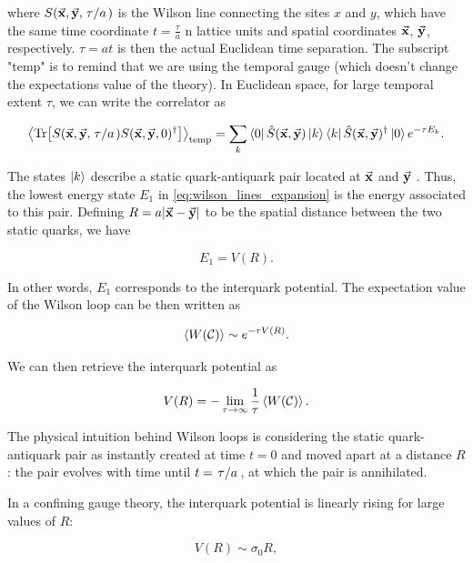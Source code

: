 \documentclass[reqno,12pt]{article}
\numberwithin{equation}{section}
\begin{document}
where $S(\va{x}, \va{y}, \flatfrac{\tau}{a})$ is the Wilson line connecting the sites $x$ and $y$, which have the same time
coordinate $t = \frac{\tau}{a}$ n lattice units and spatial coordinates $\va{x}$, $\va{y}$, respectively. $\tau = at$ is then
the actual Euclidean time separation. The subscript "temp" is to
remind that we are using the temporal gauge (which doesn't change the expectations value of the theory). 
In Euclidean space, for large temporal extent $\tau$, we can write the correlator as

\begin{equation} \label{eq:wilson_lines_expansion}
	\expval{\Tr[S(\va{x}, \va{y}, \flatfrac{\tau}{a})S(\va{x}, \va{y}, 0)^\dagger]}_\text{temp} = 
	\sum_k \bra{0}\hat{S}(\va{x}, \va{y})\ket{k}\bra{k}\hat{S}(\va{x}, \va{y})^\dagger\ket{0} e^{-\tau E_k}.
\end{equation}

The states $\ket{k}$ describe a static quark-antiquark pair located at $\va{x}$ and $\va{y}$ \cite{gattringer}. 
Thus, the lowest energy state $E_1$ in \eqref{eq:wilson_lines_expansion} is the energy associated to this pair. 
Defining $R = a|\va{x} - \va{y}|$ to be the spatial distance between the two static quarks, we have

\begin{equation}
	E_1 = V(R).
\end{equation}

In other words, $E_1$ corresponds to the interquark potential. The expectation value of the Wilson loop
can be then written as

\begin{equation}
	\expval{W(\mathcal{C})} \sim e^{-\tau V(R)}.
\end{equation}

We can then retrieve the interquark potential as

\begin{equation}
	V(R) = - \lim_{\tau \rightarrow \infty} \frac{1}{\tau} \expval{W(\mathcal{C})}.
\end{equation}

The physical intuition behind Wilson loops is considering the static quark-antiquark pair as instantly
created at time $t = 0$ and moved apart at a distance $R$: the pair evolves with time until $t = \flatfrac{\tau}{a}$, at which
the pair is annihilated. 

In a confining gauge theory, the interquark potential is linearly rising for large values of $R$: 

\begin{equation}
	V(R) \sim \sigma_0 R,
\end{equation}
\end{document}
